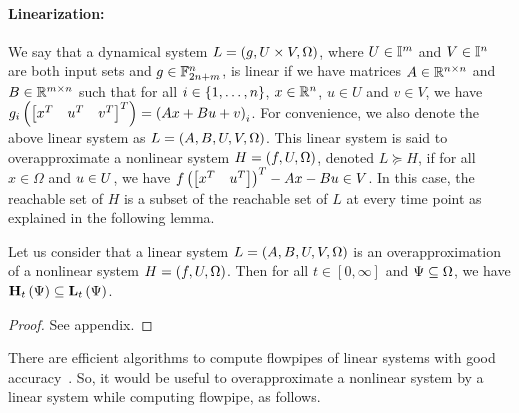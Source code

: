 \paragraph{Linearization:}  We say that a dynamical system
$L = \left(g,U\times V,\Omega\right)$, where $U\in\mathbb{I}^m$ and
$V\in\mathbb{I}^n$ are both input sets and $g\in\mathbb{F}_{2n+m}^n$, is
linear if we have matrices $A\in\mathbb{R}^{n\times n}$ and
$B\in\mathbb{R}^{m\times n}$ such that for all $i\in\left\{1,\ldots,n\right\}$,
$x\in\mathbb{R}^n$, $u\in U$ and $v\in V$, we have $ g_i\left(\begin{bmatrix}x^T
& u^T & v^T\end{bmatrix}^T\right) = \left(Ax + Bu + v\right)_i$.  For convenience, we also
denote the above linear system as $L = \left(A,B,U,V,\Omega\right)$.  This
linear system is said to overapproximate a nonlinear system $H
= \left(f,{U},\Omega\right)$, denoted $L\succeq H$, if for all
$x\in\Omega$ and $u\in{U}$, we have $f\left(\begin{bmatrix}x^T & u^T\end{bmatrix}\right)^T
- Ax - Bu \in V$.  In this case, the reachable set of $H$ is a subset
of the reachable set of $L$ at every time point as explained in the
following lemma.
%
\begin{lemma}\label{lem:inclin}
Let us consider that a linear system $L = \left(A,B,U,V,\Omega\right)$ is an
overapproximation of a nonlinear system $H = \left(f,U,\Omega\right)$.  Then
for all $t\in[0,\infty]$ and $\Psi\subseteq\Omega$, we have
$\mathbf{H}_{t}\left(\Psi\right)\subseteq \mathbf{L}_{t}\left(\Psi\right)$.
\end{lemma}
%
\begin{proof}
See appendix.
\end{proof}
%
There are efficient algorithms to compute flowpipes of linear systems
with good accuracy~\cite{girard2005reachability,girard2008efficient}.
So, it would be useful to overapproximate a nonlinear system by a
linear system while computing flowpipe, as follows.
%
